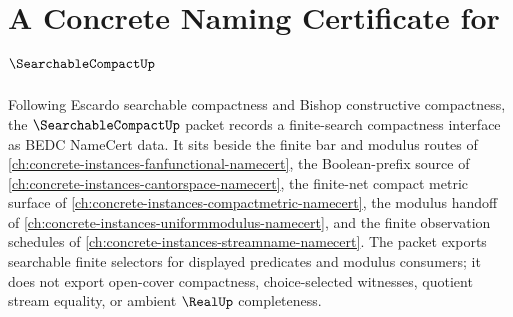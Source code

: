 \chapter{A Concrete Naming Certificate for $\SearchableCompactUp$}
\label{ch:concrete-instances-searchable-compact-namecert}

Following Escardo searchable compactness and Bishop constructive compactness, the $\SearchableCompactUp$ packet records a finite-search compactness interface as BEDC NameCert data. It sits beside the finite bar and modulus routes of \autoref{ch:concrete-instances-fanfunctional-namecert}, the Boolean-prefix source of \autoref{ch:concrete-instances-cantorspace-namecert}, the finite-net compact metric surface of \autoref{ch:concrete-instances-compactmetric-namecert}, the modulus handoff of \autoref{ch:concrete-instances-uniformmodulus-namecert}, and the finite observation schedules of \autoref{ch:concrete-instances-streamname-namecert}. The packet exports searchable finite selectors for displayed predicates and modulus consumers; it does not export open-cover compactness, choice-selected witnesses, quotient stream equality, or ambient $\RealUp$ completeness.

